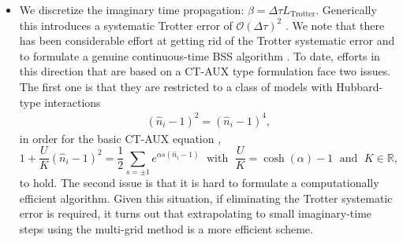 \begin{itemize}
\item  We discretize the imaginary time propagation: $\beta = \Delta \tau L_{\text{Trotter}} $. Generically this introduces a systematic Trotter error of $\mathcal{O}(\Delta \tau)^2$  \cite{Fye86}. 
We note that there has been considerable effort at getting rid of the Trotter systematic error and to formulate a genuine continuous-time BSS  algorithm \cite{Iazzi15}.   To date, efforts in this direction that are based on a CT-AUX type formulation \cite{Rombouts99,Gull08} face two issues. The first one is that they are restricted to a class of models with Hubbard-type interactions
\begin{align}
        (\hat{n}_{i}- 1)^{2}  = (\hat{n}_{i}- 1)^{4} ,
\end{align}
in order for the basic CT-AUX equation \cite{Rombouts98},
\begin{equation}
          1   + \frac{U}{K} \left(  \hat{n}_{i}- 1\right)^{2}    = \frac{1}{2}\sum_{s=\pm 1}   e^{ \alpha s \left(  \hat{n}_{i}- 1\right) }  \; \text{ with  }  \;  \frac{U}{K} = \cosh(\alpha) -1 \; \text{ and  }  \; K\in\mathbb{R},
\end{equation}
to hold.
The second issue is that it is hard to formulate a  computationally efficient algorithm.  Given this situation, if eliminating the Trotter systematic error is required, it turns out that extrapolating to small imaginary-time steps using the multi-grid method \cite{Rost12,Rost13,Bluemer08} is a more efficient scheme.


\end{itemize}
